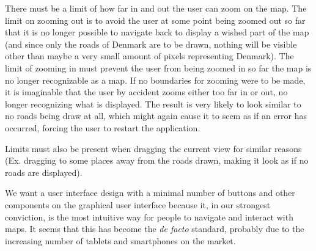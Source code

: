 There must be a limit of how far in and out the user can zoom on the map. The limit on zooming out is to avoid the user at some point being zoomed out so far that it is no longer possible to navigate back to display a wished part of the map (and since only the roads of Denmark are to be drawn, nothing will be visible other than maybe a very small amount of pixels representing Denmark). The limit of zooming in must prevent the user from being zoomed in so far the map is no longer recognizable as a map. If no boundaries for zooming were to be made, it is imaginable that the user by accident zooms either too far in or out, no longer recognizing what is displayed. The result is very likely to look similar to no roads being draw at all, which might again cause it to seem as if an error has occurred, forcing the user to restart the application.

Limits must also be present when dragging the current view for similar reasons (Ex. dragging to some places away from the roads drawn, making it look as if no roads are displayed).

We want a user interface design with a minimal number of buttons and other components on the graphical user interface because it, in our strongest conviction, is the most intuitive way for people to navigate and interact with maps. It seems that this has become the \textit{de facto} standard, probably due to the increasing number of tablets and smartphones on the market.


